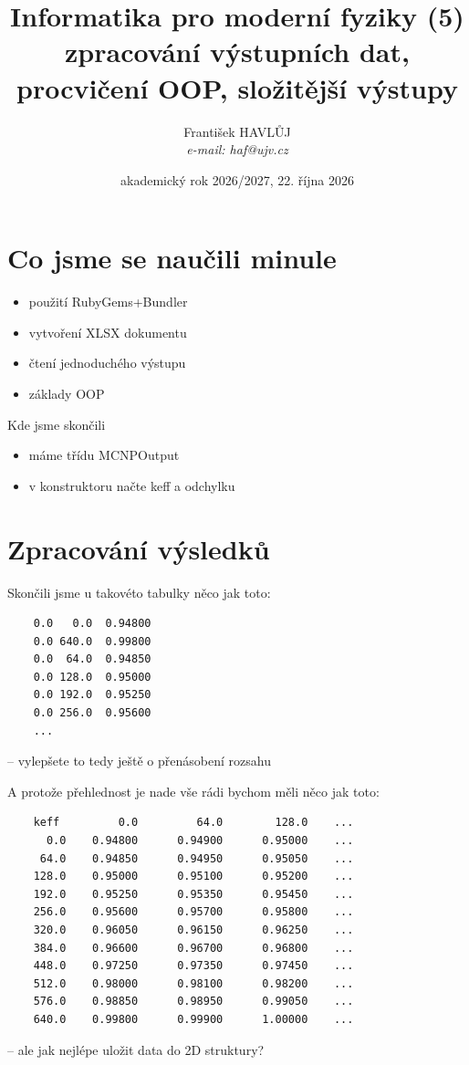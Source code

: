 \documentclass{beamer}
\title[IMF (5)]{Informatika pro moderní fyziky (5)\\zpracování výstupních dat, procvičení OOP, složitější výstupy}
\author[Franti\v{s}ek HAVL\r{U}J, ORF ÚJV Řež]{Franti\v{s}ek HAVL\r{U}J\\{\scriptsize \emph{e-mail: haf@ujv.cz}}}
\date{akademický rok 2026/2027, 22. října 2026}
\institute[ORF ÚJV Řež]
{ÚJV Řež\\oddělení Reaktorové fyziky a podpory palivového cyklu}
\begin{document}
\begin{frame}
  \titlepage
\end{frame}

\begin{frame}
  \tableofcontents
\end{frame}

\section{Co jsme se naučili minule}

\begin{frame}{}
  \begin{itemize}
    \item použití RubyGems+Bundler
    \item vytvoření XLSX dokumentu
    \item čtení jednoduchého výstupu
    \item základy OOP
  \end{itemize}
\end{frame}

\begin{frame}{Kde jsme skončili}
  \begin{itemize}
    \item máme třídu MCNPOutput
    \item v konstruktoru načte keff a odchylku 
  \end{itemize}
\end{frame}

\section{Zpracování výsledků}

\begin{frame}[fragile]{Skončili jsme u takovéto tabulky}
  něco jak toto:
  {\scriptsize
  \begin{verbatim}
    0.0   0.0  0.94800
    0.0 640.0  0.99800
    0.0  64.0  0.94850
    0.0 128.0  0.95000
    0.0 192.0  0.95250
    0.0 256.0  0.95600
    ...
  \end{verbatim}
  }
  -- vylepšete to tedy ještě o přenásobení rozsahu
\end{frame}

\begin{frame}[fragile]{A protože přehlednost je nade vše}
  rádi bychom měli něco jak toto:
  {\scriptsize
  \begin{verbatim}
    keff         0.0         64.0        128.0    ...
      0.0    0.94800      0.94900      0.95000    ...
     64.0    0.94850      0.94950      0.95050    ...
    128.0    0.95000      0.95100      0.95200    ...
    192.0    0.95250      0.95350      0.95450    ...
    256.0    0.95600      0.95700      0.95800    ...
    320.0    0.96050      0.96150      0.96250    ...
    384.0    0.96600      0.96700      0.96800    ...
    448.0    0.97250      0.97350      0.97450    ...
    512.0    0.98000      0.98100      0.98200    ...
    576.0    0.98850      0.98950      0.99050    ...
    640.0    0.99800      0.99900      1.00000    ...
  \end{verbatim}
  }
  -- ale jak nejlépe uložit data do 2D struktury?
\end{frame}
\end{document}
